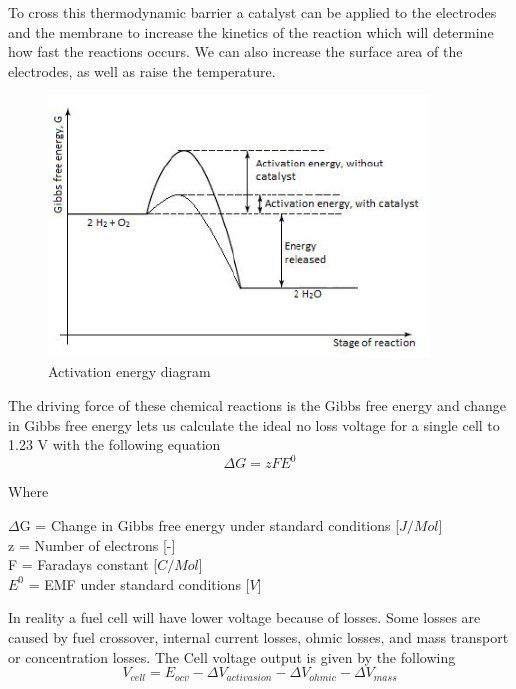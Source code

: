 To cross this thermodynamic barrier a  catalyst can be applied to the electrodes and the membrane to increase the kinetics of the reaction which will determine how fast the reactions occurs. We can also increase the surface area of the electrodes, as well as raise the temperature. 

\begin{figure}[ht]
    \centering
    \includegraphics[width=0.9\textwidth]{DIV./Bilder/activation.jpg}
    \caption{Activation energy diagram}
    \label{fig:Activation}
\end{figure}

The driving force of these chemical reactions is the Gibbs free energy and change in Gibbs free energy lets us calculate the ideal no loss voltage for a single cell to 1.23 V with the following equation
\begin{equation}
    \Delta G = zFE^0
\end{equation}

Where
\begin{center}
    $\Delta$G = Change in Gibbs free energy under standard conditions [$J/Mol$] \\
    z = Number of electrons [-] \\
    F = Faradays constant [$C/Mol$] \\
    $E^0$ = EMF under standard conditions [$V$]
\end{center}

In reality a fuel cell will have lower voltage because of losses. Some losses are caused by fuel crossover, internal current losses, ohmic losses, and mass transport or concentration losses. The Cell voltage output is given by the following
\begin{equation}
    V_{cell} = E_{ocv} - \Delta V_{activasion} - \Delta V_{ohmic} - \Delta V_{mass}
\end{equation}

